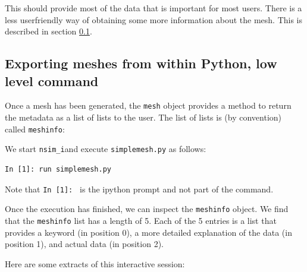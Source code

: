 \documentclass[10pt,a4paper]{book}
\newcommand{\nsimi}{\texttt{nsim\_i}}
\begin{document}
This should provide most of the data that is important for most users. There is a less userfriendly way 
of obtaining some more information about the mesh. This is described in section \ref{sec:exporting-meshes-low-level}.

\subsection{Exporting meshes from within Python, low level command}\label{sec:exporting-meshes-low-level}

Once a mesh has been generated, the \texttt{mesh} object provides a
method to return the metadata as a list of lists to the user. The list
of lists is (by convention) called \texttt{meshinfo}:



We start \nsimi and execute \texttt{simplemesh.py} as follows:

\begin{lstlisting}
In [1]: run simplemesh.py
\end{lstlisting}
Note that \verb|In [1]: | is the ipython prompt and not part of the command.

Once the execution has finished, we can inspect the \texttt{meshinfo}
object. We find that the \texttt{meshinfo} list has a length of 5.
Each of the 5 entries is a list that provides a keyword (in position
0), a more detailed explanation of the data (in position 1), and
actual data (in position 2). 

Here are some extracts of this interactive session:
\end{document}
